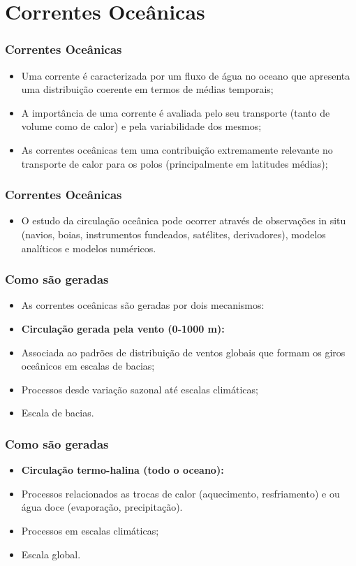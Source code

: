 \section{Correntes Oceânicas}
\begin{frame}
\frametitle{Correntes Oceânicas}
  \begin{itemize}[<+-| alert@+>]
    \item Uma corrente é caracterizada por um fluxo de água no oceano que
          apresenta uma distribuição coerente em termos de médias temporais;
    \item A importância de uma corrente é avaliada pelo seu transporte (tanto
          de volume como de calor) e pela variabilidade dos mesmos;
    \item As correntes oceânicas tem uma contribuição extremamente relevante no
          transporte de calor para os polos (principalmente em latitudes médias);
  \end{itemize}
\end{frame}


\begin{frame}
\frametitle{Correntes Oceânicas}
  \begin{itemize}[<+-| alert@+>]
    \item O estudo da circulação oceânica pode ocorrer através de observações
          in situ (navios, boias, instrumentos fundeados, satélites,
          derivadores), modelos analíticos e modelos numéricos.
  \end{itemize}
\end{frame}


\begin{frame}
\frametitle{Como são geradas}
  \begin{itemize}[<+-| alert@+>]
    \item As correntes oceânicas são geradas por dois mecanismos:
    \item {\bf Circulação gerada pela vento (0-1000 m):}
    \item Associada ao padrões de distribuição de ventos globais que formam os
          giros oceânicos em escalas de bacias;
    \item Processos desde variação sazonal até escalas climáticas;
    \item Escala de bacias.
   \end{itemize}
\end{frame}


\begin{frame}
\frametitle{Como são geradas}
  \begin{itemize}[<+-| alert@+>]
    \item {\bf Circulação termo-halina (todo o oceano):}
    \item Processos relacionados as trocas de calor (aquecimento, resfriamento)
          e ou água doce (evaporação, precipitação).
    \item Processos em escalas climáticas;
    \item Escala global.
   \end{itemize}
\end{frame}





